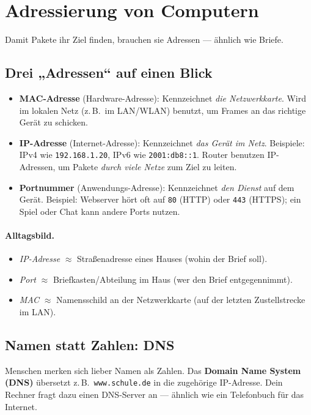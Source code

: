 \documentclass[../skript/main.tex]{subfiles}
\begin{document}
	\section{Adressierung von Computern}\label{sec:adressierung}
	Damit Pakete ihr Ziel finden, brauchen sie Adressen — ähnlich wie Briefe.
	
	\subsection*{Drei „Adressen“ auf einen Blick}
	\begin{itemize}
		\item \textbf{MAC-Adresse} (Hardware-Adresse): Kennzeichnet \emph{die Netzwerkkarte}. Wird im lokalen Netz
		(z.\,B.\ im LAN/WLAN) benutzt, um Frames an das richtige Gerät zu schicken.
		\item \textbf{IP-Adresse} (Internet-Adresse): Kennzeichnet \emph{das Gerät im Netz}. Beispiele:
		IPv4 wie \texttt{192.168.1.20}, IPv6 wie \texttt{2001:db8::1}. Router benutzen IP-Adressen,
		um Pakete \emph{durch viele Netze} zum Ziel zu leiten.
		\item \textbf{Portnummer} (Anwendungs-Adresse): Kennzeichnet \emph{den Dienst} auf dem Gerät.
		Beispiel: Webserver hört oft auf \texttt{80} (HTTP) oder \texttt{443} (HTTPS); ein Spiel oder
		Chat kann andere Ports nutzen.
	\end{itemize}
	
	\paragraph{Alltagsbild.}
	\begin{itemize}
		\item \emph{IP-Adresse} \(\approx\) Straßenadresse eines Hauses (wohin der Brief soll).
		\item \emph{Port} \(\approx\) Briefkasten/Abteilung im Haus (wer den Brief entgegennimmt).
		\item \emph{MAC} \(\approx\) Namensschild an der Netzwerkkarte (auf der letzten Zustellstrecke im LAN).
	\end{itemize}
	
	\subsection*{Namen statt Zahlen: DNS}
	Menschen merken sich lieber Namen als Zahlen. Das \textbf{Domain Name System (DNS)} übersetzt
	z.\,B.\ \texttt{www.schule.de} in die zugehörige IP-Adresse. Dein Rechner fragt dazu einen
	DNS-Server an — ähnlich wie ein Telefonbuch für das Internet.
\end{document}

